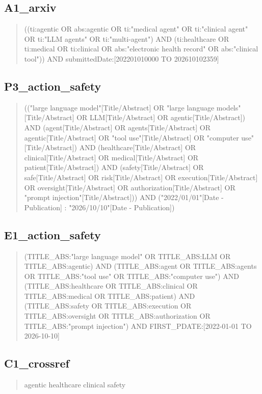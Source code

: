 \documentclass[journal,onecolumn,10pt]{IEEEtran}
\begin{document}
\subsection*{A1\_arxiv}
\begin{quote}\small\raggedright ((ti:agentic OR abs:agentic OR ti:"medical agent" OR ti:"clinical agent" OR ti:"LLM agents" OR ti:"multi-agent") AND (ti:healthcare OR ti:medical OR ti:clinical OR abs:"electronic health record" OR abs:"clinical tool")) AND submittedDate:[202201010000 TO 202610102359]\end{quote}


\subsection*{P3\_action\_safety}
\begin{quote}\small\raggedright (("large language model"[Title/Abstract] OR "large language models"[Title/Abstract] OR LLM[Title/Abstract] OR agentic[Title/Abstract]) AND (agent[Title/Abstract] OR agents[Title/Abstract] OR agentic[Title/Abstract] OR "tool use"[Title/Abstract] OR "computer use"[Title/Abstract]) AND (healthcare[Title/Abstract] OR clinical[Title/Abstract] OR medical[Title/Abstract] OR patient[Title/Abstract]) AND (safety[Title/Abstract] OR safe[Title/Abstract] OR risk[Title/Abstract] OR execution[Title/Abstract] OR oversight[Title/Abstract] OR authorization[Title/Abstract] OR "prompt injection"[Title/Abstract])) AND ("2022/01/01"[Date - Publication] : "2026/10/10"[Date - Publication])\end{quote}


\subsection*{E1\_action\_safety}
\begin{quote}\small\raggedright (TITLE\_ABS:"large language model" OR TITLE\_ABS:LLM OR TITLE\_ABS:agentic) AND (TITLE\_ABS:agent OR TITLE\_ABS:agents OR TITLE\_ABS:"tool use" OR TITLE\_ABS:"computer use") AND (TITLE\_ABS:healthcare OR TITLE\_ABS:clinical OR TITLE\_ABS:medical OR TITLE\_ABS:patient) AND (TITLE\_ABS:safety OR TITLE\_ABS:execution OR TITLE\_ABS:oversight OR TITLE\_ABS:authorization OR TITLE\_ABS:"prompt injection") AND FIRST\_PDATE:[2022-01-01 TO 2026-10-10]\end{quote}


\subsection*{C1\_crossref}
\begin{quote}\small\raggedright agentic healthcare clinical safety\end{quote}
\end{document}
